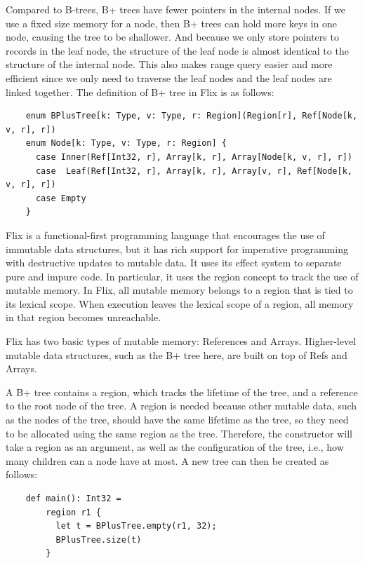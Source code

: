 \documentclass[11pt]{report}
\theoremstyle{definition}
\begin{document}
Compared to B-trees, B+ trees have fewer pointers in the internal nodes. If we use a fixed size memory for a node, then B+ trees can hold more keys in one node, causing the tree to be shallower. And because we only store pointers to records in the leaf node, the structure of the leaf node is almost identical to the structure of the internal node. This also makes range query easier and more efficient since we only need to traverse the leaf nodes and the leaf nodes are linked together. The definition of B+ tree in Flix is as follows:

\begin{verbatim}
    enum BPlusTree[k: Type, v: Type, r: Region](Region[r], Ref[Node[k, v, r], r])
    enum Node[k: Type, v: Type, r: Region] {
      case Inner(Ref[Int32, r], Array[k, r], Array[Node[k, v, r], r])
      case  Leaf(Ref[Int32, r], Array[k, r], Array[v, r], Ref[Node[k, v, r], r])
      case Empty
    }
\end{verbatim}

Flix is a functional-first programming language that encourages the use of immutable data structures, but it has rich support for imperative programming with destructive updates to mutable data. It uses its effect system to separate pure and impure code. In particular, it uses the region concept to track the use of mutable memory. In Flix, all mutable memory belongs to a region that is tied to its lexical scope. When execution leaves the lexical scope of a region, all memory in that region becomes unreachable.

Flix has two basic types of mutable memory: References and Arrays. Higher-level mutable data structures, such as the B+ tree here, are built on top of Refs and Arrays.

A B+ tree contains a region, which tracks the lifetime of the tree, and a reference to the root node of the tree. A region is needed because other mutable data, such as the nodes of the tree, should have the same lifetime as the tree, so they need to be allocated using the same region as the tree. Therefore, the constructor will take a region as an argument, as well as the configuration of the tree, i.e., how many children can a node have at most. A new tree can then be created as follows:

\begin{verbatim}
    def main(): Int32 =
        region r1 {
          let t = BPlusTree.empty(r1, 32);
          BPlusTree.size(t)
        }
\end{verbatim}
\end{document}
